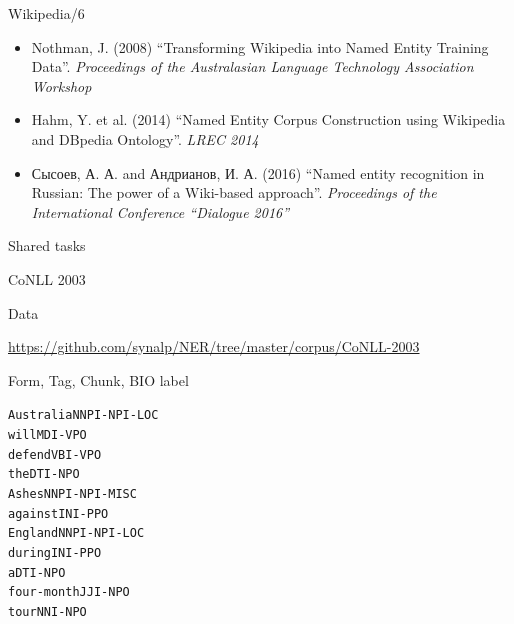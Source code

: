 \documentclass[10pt, compress]{beamer}
\begin{document}
\begin{frame}{Wikipedia/6}

\begin{itemize}
  \item Nothman, J. (2008) ``Transforming Wikipedia into Named Entity Training Data''. \emph{Proceedings of the Australasian Language Technology Association Workshop}
  \item Hahm, Y. et al. (2014) ``Named Entity Corpus Construction using Wikipedia and DBpedia Ontology''. \emph{LREC 2014}
  \item Сысоев, А. А. and Андрианов, И. А. (2016) ``Named entity recognition in Russian: The power of a Wiki-based approach''. \emph{Proceedings of the International Conference “Dialogue 2016”}
\end{itemize}

\end{frame}



\begin{frame}[standout]
Shared tasks
\end{frame}

\begin{frame}{CoNLL 2003}



\end{frame}

\begin{frame}{Data}

\begin{center}
\url{https://github.com/synalp/NER/tree/master/corpus/CoNLL-2003}
\end{center}

Form, Tag, Chunk, BIO label

\begin{alltt}

Australia NNP I-NP I-LOC  \\ 
will MD I-VP O \\ 
defend VB I-VP O \\ 
the DT I-NP O \\ 
Ashes NNP I-NP I-MISC \\ 
against IN I-PP O \\
England NNP I-NP I-LOC \\
during IN I-PP O \\ 
a DT I-NP O \\ 
four-month JJ I-NP O \\ 
tour NN I-NP O \\ 

\end{alltt}

\end{frame}
\end{document}
